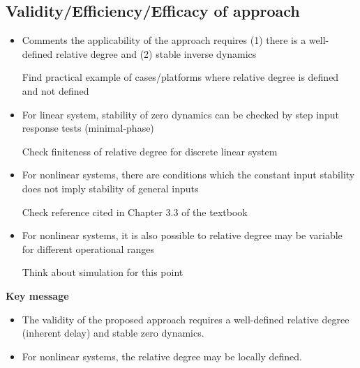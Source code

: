 \subsection{Validity/Efficiency/Efficacy of approach}
\begin{itemize}
\color{grey1}
\item Comments the applicability of the approach requires (1) there is a well-defined relative degree and (2) stable inverse dynamics

\noindent\todo Find practical example of cases/platforms where relative degree is defined and not defined

\item For linear system, stability of zero dynamics can be checked by step input response tests (minimal-phase) 

\noindent\todo Check finiteness of relative degree for discrete linear system
\item For nonlinear systems, there are conditions which the constant input stability does not imply stability of general inputs

\noindent\todo Check reference cited in Chapter 3.3 of the textbook
\item For nonlinear systems, it is also possible to relative degree may be variable for different operational ranges

\noindent\todo Think about simulation for this point
\end{itemize}
\textbf{Key message}
\begin{itemize}
\color{grey1}
\item The validity of the proposed approach requires a well-defined relative degree (inherent delay) and stable zero dynamics.
\item For nonlinear systems, the relative degree may be locally defined.
\end{itemize}


